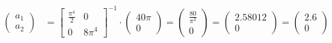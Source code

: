 \documentclass[
final,
a4paper,
oneside,
parskip=full,
headings=standardclasses,
headings=big,
pointednumbers,
fleqn
]{scrartcl}
\newcommand{\f}[2]{\frac{#1}{#2}}
\begin{document}
    {\setlength{\abovedisplayskip}{6pt}
    \setlength{\belowdisplayskip}{-12pt}
    \begin{align*}
        \begin{pmatrix}
            a_1 \\
            a_2
        \end{pmatrix} & =
        \begin{bmatrix}
            \f{\pi^4}{2} & 0 \\
            0             & 8\pi^4
        \end{bmatrix}^{-1} \cdot
        \begin{pmatrix}
            40 \pi \\
            0
        \end{pmatrix} =
        \begin{pmatrix}
            \f{80}{\pi^3} \\
            0
        \end{pmatrix} =
        \begin{pmatrix}
            2.58012 \\
            0
        \end{pmatrix} =
        \begin{pmatrix}
            2.6 \\
            0
        \end{pmatrix}
    \end{align*}}
\end{document}
